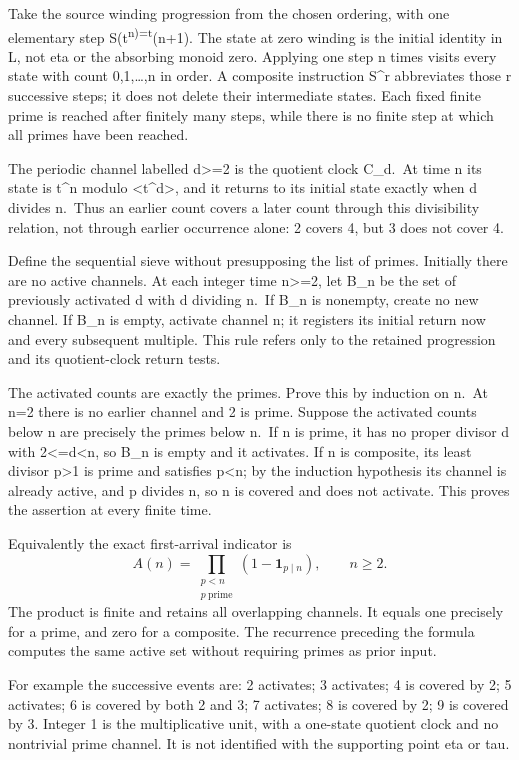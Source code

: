 \documentclass[
  11pt,
]{article}
\begin{document}
Take the source winding progression from the chosen ordering, with one
elementary step S(t\textsuperscript{n)=t}(n+1). The state at zero
winding is the initial identity in L, not eta or the absorbing monoid
zero. Applying one step n times visits every state with count
0,1,\ldots,n in order. A composite instruction S\^{}r abbreviates those
r successive steps; it does not delete their intermediate states. Each
fixed finite prime is reached after finitely many steps, while there is
no finite step at which all primes have been reached.

The periodic channel labelled d\textgreater=2 is the quotient clock
C\_d.~At time n its state is t\^{}n modulo \textless t\^{}d\textgreater,
and it returns to its initial state exactly when d divides n.~Thus an
earlier count covers a later count through this divisibility relation,
not through earlier occurrence alone: 2 covers 4, but 3 does not cover
4.

Define the sequential sieve without presupposing the list of primes.
Initially there are no active channels. At each integer time
n\textgreater=2, let B\_n be the set of previously activated d with d
dividing n.~If B\_n is nonempty, create no new channel. If B\_n is
empty, activate channel n; it registers its initial return now and every
subsequent multiple. This rule refers only to the retained progression
and its quotient-clock return tests.

The activated counts are exactly the primes. Prove this by induction on
n.~At n=2 there is no earlier channel and 2 is prime. Suppose the
activated counts below n are precisely the primes below n.~If n is
prime, it has no proper divisor d with 2\textless=d\textless n, so B\_n
is empty and it activates. If n is composite, its least divisor
p\textgreater1 is prime and satisfies p\textless n; by the induction
hypothesis its channel is already active, and p divides n, so n is
covered and does not activate. This proves the assertion at every finite
time.

Equivalently the exact first-arrival indicator is \[
A(n)=\prod_{\substack{p<n\\p\ \mathrm{prime}}}
\left(1-\mathbf 1_{p\mid n}\right),\qquad n\ge2.
\] The product is finite and retains all overlapping channels. It equals
one precisely for a prime, and zero for a composite. The recurrence
preceding the formula computes the same active set without requiring
primes as prior input.

For example the successive events are: 2 activates; 3 activates; 4 is
covered by 2; 5 activates; 6 is covered by both 2 and 3; 7 activates; 8
is covered by 2; 9 is covered by 3. Integer 1 is the multiplicative
unit, with a one-state quotient clock and no nontrivial prime channel.
It is not identified with the supporting point eta or tau.
\end{document}
